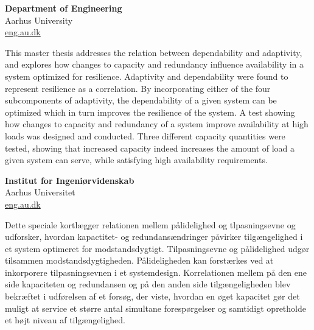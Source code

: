 {\textbf{Department of Engineering}\\Aarhus University\\\href{eng.au.dk}{eng.au.dk}}
{%

This master thesis addresses the relation between dependability and adaptivity, and explores how changes to capacity and redundancy influence availability in a system optimized for resilience. Adaptivity and dependability were found to represent resilience as a correlation. By incorporating either of the four subcomponents of adaptivity, the dependability of a given system can be optimized which in turn improves the resilience of the system. A test showing how changes to capacity and redundancy of a system improve availability at high loads was designed and conducted. Three different capacity quantities were tested, showing that increased capacity indeed increases the amount of load a given system can serve, while satisfying high availability requirements.
}

\cleardoublepage
{
{\textbf{Institut for Ingeniørvidenskab}\\Aarhus Universitet\\\href{eng.au.dk}{eng.au.dk}
}
{%
	Dette speciale kortlægger relationen mellem pålidelighed og tlpasningsevne og udforsker, hvordan kapactitet- og redundansændringer påvirker tilgængelighed i et system optimeret for modstandsdygtigt. Tilpasningsevne og pålidelighed udgør tilsammen modstandsdygtigheden. Pålideligheden kan forstærkes ved at inkorporere tilpasningsevnen i et systemdesign.
	Korrelationen mellem på den ene side kapaciteten og redundansen og på den anden side tilgængeligheden blev bekræftet i udførelsen af et forsøg, der viste, hvordan en øget kapacitet gør det muligt at service et større antal simultane forespørgelser og samtidigt opretholde et højt niveau af tilgængelighed.
	
}
}
